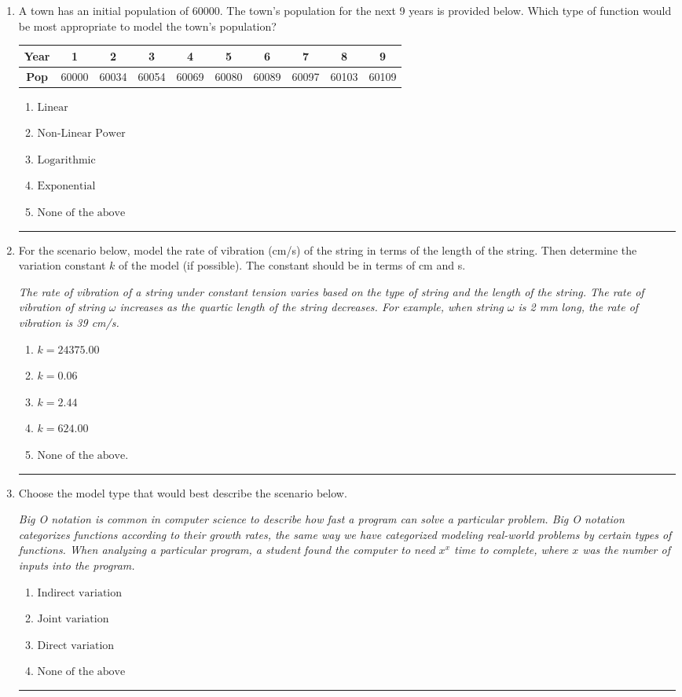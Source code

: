 \documentclass[14pt]{extbook}
\newcommand{\litem}[1]{\item#1\hspace*{-1cm}\rule{\textwidth}{0.4pt}}
\begin{document}
\begin{enumerate}
{\begin{enumerate}[label=\Alph*.]
\end{enumerate} }
\litem{
A town has an initial population of 60000. The town's population for the next 9 years is provided below. Which type of function would be most appropriate to model the town's population?

\begin{tabular}{c|c|c|c|c|c|c|c|c|c}
\textbf{Year} &1 &2 &3 &4 &5 &6 &7 &8 &9\tabularnewline \hline
\textbf{Pop} &60000 &60034 &60054 &60069 &60080 &60089 &60097 &60103 &60109\end{tabular}\begin{enumerate}[label=\Alph*.]
\item \( \text{Linear} \)
\item \( \text{Non-Linear Power} \)
\item \( \text{Logarithmic} \)
\item \( \text{Exponential} \)
\item \( \text{None of the above} \)

\end{enumerate} }
\litem{
For the scenario below, model the rate of vibration (cm/s) of the string in terms of the length of the string. Then determine the variation constant $k$ of the model (if possible). The constant should be in terms of cm and s.
\begin{center}
    \textit{ The rate of vibration of a string under constant tension varies based on the type of string and the length of the string. The rate of vibration of string $\omega$ increases as the quartic length of the string decreases. For example, when string $\omega$ is 2 mm long, the rate of vibration is 39 cm/s. }
\end{center}
\begin{enumerate}[label=\Alph*.]
\item \( k = 24375.00 \)
\item \( k = 0.06 \)
\item \( k = 2.44 \)
\item \( k = 624.00 \)
\item \( \text{None of the above.} \)

\end{enumerate} }
\litem{
Choose the model type that would best describe the scenario below.
\begin{center}
    \textit{ Big O notation is common in computer science to describe how fast a program can solve a particular problem. Big O notation categorizes functions according to their growth rates, the same way we have categorized modeling real-world problems by certain types of functions. When analyzing a particular program, a student found the computer to need $x^x$ time to complete, where $x$ was the number of inputs into the program. }
\end{center}
\begin{enumerate}[label=\Alph*.]
\item \( \text{Indirect variation} \)
\item \( \text{Joint variation} \)
\item \( \text{Direct variation} \)
\item \( \text{None of the above} \)


\end{enumerate}}
\end{enumerate}
\end{document}
